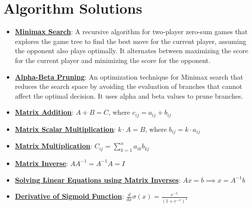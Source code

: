 \documentclass{article}%
\begin{document}
\section{Algorithm Solutions}%
\label{sec:AlgorithmSolutions}%
\begin{itemize}[leftmargin=*]%
\item \href{https://www.math.purdue.edu/~yipn/351/02L2-Intro.pdf#page=22}{\textbf{Minimax Search}}: A recursive algorithm for two-player zero-sum games that explores the game tree to find the best move for the current player, assuming the opponent also plays optimally. It alternates between maximizing the score for the current player and minimizing the score for the opponent.%
\item \href{https://www.math.purdue.edu/~yipn/351/02L2-Intro.pdf#page=23}{\textbf{Alpha{-}Beta Pruning}}: An optimization technique for Minimax search that reduces the search space by avoiding the evaluation of branches that cannot affect the optimal decision. It uses alpha and beta values to prune branches.%
\end{itemize}%
\begin{itemize}[leftmargin=*]%
\item \href{https://www.math.purdue.edu/~yipn/351/04L1-Linear Algebra Primer.pdf#page=9}{\textbf{Matrix Addition}}: $A + B = C$, where $c_{ij} = a_{ij} + b_{ij}$%
\item \href{https://www.math.purdue.edu/~yipn/351/04L1-Linear Algebra Primer.pdf#page=9}{\textbf{Matrix Scalar Multiplication}}: $k \cdot A = B$, where $b_{ij} = k \cdot a_{ij}$%
\item \href{https://www.math.purdue.edu/~yipn/351/04L1-Linear Algebra Primer.pdf#page=14}{\textbf{Matrix Multiplication}}: $C_{ij} = \sum_{k=1}^{n} a_{ik}b_{kj}$%
\item \href{https://www.math.purdue.edu/~yipn/351/04L1-Linear Algebra Primer.pdf#page=10}{\textbf{Matrix Inverse}}: $AA^{-1} = A^{-1}A = I$%
\item \href{https://www.math.purdue.edu/~yipn/351/04L1-Linear Algebra Primer.pdf#page=12}{\textbf{Solving Linear Equations using Matrix Inverses}}: $Ax = b \implies x = A^{-1}b$%
\item \href{https://www.math.purdue.edu/~yipn/351/04L1-Linear Algebra Primer.pdf#page=21}{\textbf{Derivative of Sigmoid Function}}: $\frac{d}{dx} \sigma(x) = \frac{e^{-x}}{(1 + e^{-x})^2}$%
\end{itemize}%
\end{document}
